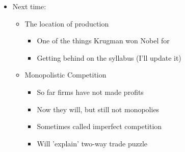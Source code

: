 \documentclass[ignorenonframetext,]{beamer}
\begin{document}
\begin{frame}
\begin{itemize}
\itemsep1pt\parskip0pt
\item
  Next time: 
  \begin{itemize}
        \item The location of production
        \begin{itemize}
            \item One of the things Krugman won Nobel for 
            \item Getting behind on the syllabus (I'll update it)
        \end{itemize}
        \item Monopolistic Competition
        \begin{itemize}
            \item So far firms have not made profits
            \item Now they will, but still not monopolies
            \item Sometimes called imperfect competition
            \item Will 'explain' two-way trade puzzle
        \end{itemize}
    \end{itemize}
\end{itemize}

\end{frame}
\end{document}
